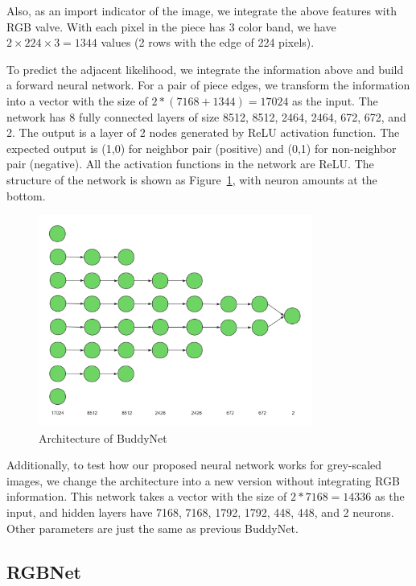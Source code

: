 \documentclass{article}
\begin{document}
Also, as an import indicator of the image, we integrate the above features with RGB valve. With each pixel in the piece has 3 color band, we have $2\times 224\times 3=1344$ values (2 rows with the edge of 224 pixels).

To predict the adjacent likelihood, we integrate the information above and build a forward neural network. For a pair of piece edges, we transform the information into a vector with the size of $2*(7168+1344)=17024$ as the input. The network has 8 fully connected layers of size 8512, 8512, 2464, 2464, 672, 672, and 2. The output is a layer of 2 nodes generated by ReLU activation function. The expected output is (1,0) for neighbor pair (positive) and (0,1) for non-neighbor pair (negative). All the activation functions in the network are ReLU. The structure of the network is shown as Figure~\ref{fig:buddynet}, with neuron amounts at the bottom.

\begin{figure}
    \centering
    \includegraphics[width=0.8\textwidth]{BuddyNet}
    \caption{Architecture of BuddyNet}
    \label{fig:buddynet}
\end{figure}

Additionally, to test how our proposed neural network works for grey-scaled images, we change the architecture into a new version without integrating RGB information. This network takes a vector with the size of $2*7168=14336$ as the input, and hidden layers have 7168, 7168, 1792, 1792, 448, 448, and 2 neurons. Other parameters are just the same as previous BuddyNet.

\subsection{RGBNet}
\end{document}
